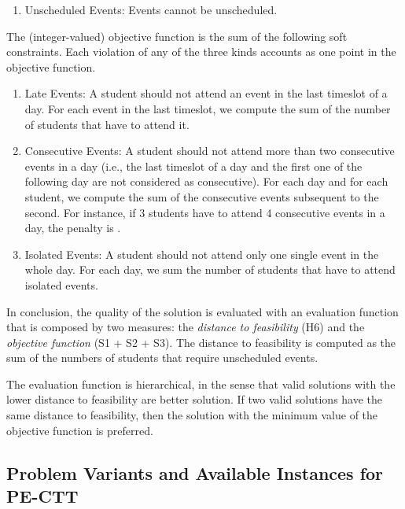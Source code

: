 \documentclass[authoryear,preprint,a4paper,12pt]{elsarticle}
\begin{document}
\begin{enumerate}[H6.]
\item \textsf{Unscheduled Events:} Events cannot be
  unscheduled.\label{con:unscheduled}
\end{enumerate}

The (integer-valued) objective function is the sum
of the following soft constraints. Each violation of any of
the three kinds accounts as one point in the objective function.

\begin{enumerate}[S1.]
\item \textsf{Late Events:} A student should not attend an event in
  the last timeslot of a day. For each event in the last timeslot, we
  compute the sum of the number of students that have to attend
  it.\label{obj:late-event}
\item \textsf{Consecutive Events:} A student should not attend more
  than two consecutive events in a day (i.e., the last timeslot of a
  day and the first one of the following day are not considered as
  consecutive). For each day and for each student, we compute the sum
  of the consecutive events subsequent to the second.  For instance,
  if 3 students have to attend 4 consecutive events in a day, the penalty is
  .  \label{obj:consecutive-event}
\item \textsf{Isolated Events:} A student should not attend only one
  single event in the whole day. For each day, we sum the number of
  students that have to attend isolated
  events.\label{obj:isolated-event}
\end{enumerate}

In conclusion, the quality of the solution is evaluated with an
evaluation function that is composed by two measures: the
\emph{distance to feasibility} (H6) and the \emph{objective function}
(S1 + S2 + S3). The distance to feasibility is computed as the sum of
the numbers of students that require unscheduled events.

The evaluation function is hierarchical, in the sense that valid solutions with the lower distance to feasibility are better solution. If two valid solutions have the same distance
to feasibility, then the solution with the minimum value of the
objective function is preferred.

\subsection{Problem Variants and Available Instances for PE-CTT}
\label{sec:instances}
\end{document}
